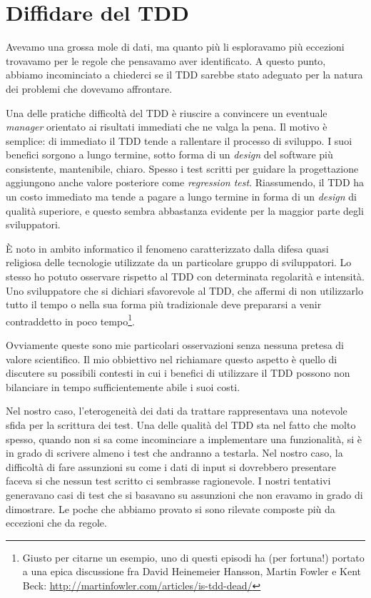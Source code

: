 \documentclass[12pt]{report}
\begin{document}
\section{Diffidare del TDD}

Avevamo una grossa mole di dati, ma quanto più li esploravamo più
eccezioni trovavamo per le regole che pensavamo aver 
identificato. A questo punto, abbiamo incominciato a chiederci se
il TDD sarebbe stato adeguato per la natura dei problemi che
dovevamo affrontare.

Una delle pratiche difficoltà del TDD è riuscire a convincere un eventuale
\textit{manager} orientato ai risultati immediati che ne valga la pena. 
Il motivo è semplice: di immediato il TDD tende a rallentare 
il processo di sviluppo. I suoi benefici sorgono a lungo termine, 
sotto forma di un \textit{design} del software più consistente,
mantenibile, chiaro. Spesso i test scritti per guidare 
la progettazione aggiungono anche valore posteriore 
come \textit{regression test}. Riassumendo, 
il TDD ha un costo immediato ma tende a pagare a lungo
termine in forma di un \textit{design} di qualità superiore, e questo
sembra abbastanza evidente per la maggior parte degli sviluppatori.

È noto in ambito informatico il fenomeno caratterizzato
dalla difesa quasi religiosa delle tecnologie utilizzate da un
particolare gruppo di sviluppatori. Lo stesso ho potuto
osservare rispetto al TDD con determinata regolarità e intensità.
Uno sviluppatore che si dichiari
sfavorevole al TDD, che affermi di non utilizzarlo tutto il tempo o 
nella sua forma più tradizionale deve prepararsi a venir 
contraddetto in poco tempo\footnote{
	Giusto per citarne un esempio,
	uno di questi episodi ha (per fortuna!)
	portato a una epica discussione fra David Heinemeier Hansson,
	Martin Fowler e Kent Beck: 
	\url{http://martinfowler.com/articles/is-tdd-dead/}
}.
	
Ovviamente queste sono mie particolari osservazioni senza nessuna
pretesa di valore scientifico. Il mio obbiettivo nel
richiamare questo aspetto è quello di discutere su possibili
contesti in cui i benefici di utilizzare il TDD possono non bilanciare
in tempo sufficientemente abile i suoi costi. 

Nel nostro caso, l'eterogeneità dei dati da trattare rappresentava 
una notevole sfida per la scrittura dei test. Una delle qualità 
del TDD sta nel fatto che molto spesso, quando non si sa 
come incominciare a implementare una funzionalità, si è in
grado di scrivere almeno i test che andranno a testarla. Nel nostro
caso, la difficoltà di fare assunzioni su come i dati di input 
si dovrebbero presentare faceva si che nessun test scritto 
ci sembrasse ragionevole. I nostri tentativi generavano casi di 
test che si basavano su assunzioni che non eravamo in grado di 
dimostrare. Le poche che abbiamo provato si sono rilevate composte 
più da eccezioni che da regole.
\end{document}
